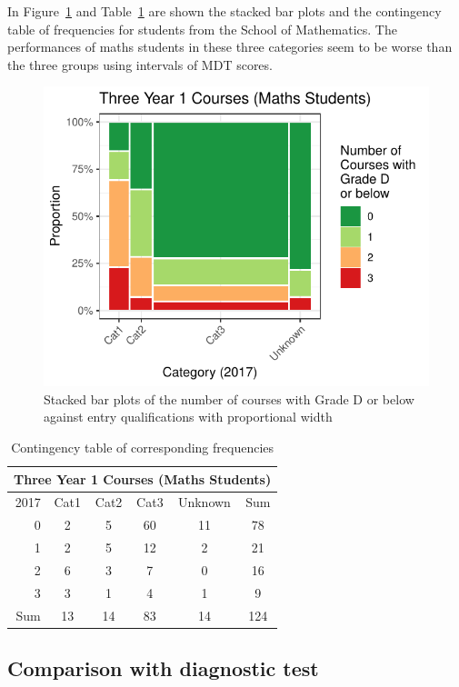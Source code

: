 \documentclass[a4paper]{report}
\begin{document}
In Figure~\ref{fig:REL_Y1Fs_vs_Qual_maths} and Table~\ref{tab:REL_Y1Fs_vs_Qual_maths} are shown the stacked bar plots and the contingency table of frequencies for students from the School of Mathematics. The performances of maths students in these three categories seem to be worse than the three groups using intervals of MDT scores. 

\begin{figure}[H]
  \centering
  \includegraphics[width=.7\linewidth]{fig/REL_Y1Fs_vs_Qual_maths.pdf}
  \caption{\label{fig:REL_Y1Fs_vs_Qual_maths}Stacked bar plots of the number of courses with Grade D or below against entry qualifications with proportional width}
\end{figure}

\begin{table}[H]
  \centering
  \begin{tabular}{r|cccc|c}
    \hline
    \multicolumn{6}{c}{\textbf{Three Year 1 Courses (Maths Students)}} \\
    \hline
   2017 & Cat1 & Cat2 & Cat3 & Unknown & Sum \\ 
    \hline
  0 & 2 & 5 & 60 & 11 & 78 \\ 
    1 & 2 & 5 & 12 & 2 & 21 \\ 
    2 & 6 & 3 & 7 & 0 & 16 \\ 
    3 & 3 & 1 & 4 & 1 & 9 \\ 
    \hline
    Sum & 13 & 14 & 83 & 14 & 124 \\ 
     \hline
  \end{tabular}
  \caption{\label{tab:REL_Y1Fs_vs_Qual_maths}Contingency table of corresponding frequencies}
\end{table}

\subsection{Comparison with diagnostic test}
\end{document}
